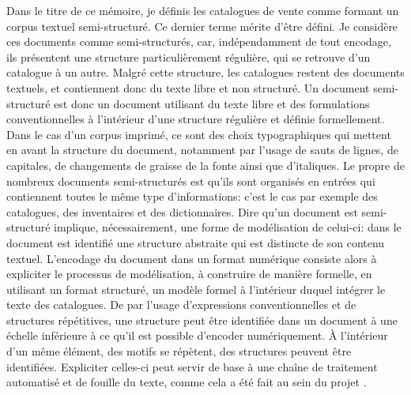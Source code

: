 Dans le titre de ce mémoire, je définis les catalogues de vente comme formant un corpus textuel semi-structuré. Ce dernier terme mérite d'être défini. Je considère ces documents comme semi-structurés, car, indépendamment de tout encodage, ils présentent une structure particulièrement régulière, qui se retrouve d'un catalogue à un autre. Malgré cette structure, les catalogues restent des documents textuels, et contiennent donc du texte libre et non structuré. Un document semi-structuré est donc un document utilisant du texte libre et des formulations conventionnelles à l'intérieur d'une structure régulière et définie formellement. Dans le cas d'un corpus imprimé, ce sont des choix typographiques qui mettent en avant la structure du document, notamment par l'usage de sauts de lignes, de capitales, de changements de graisse de la fonte ainsi que d'italiques. Le propre de nombreux documents semi-structurés est qu'ils sont organisés en entrées qui contiennent toutes le même type d'informations: c'est le cas par exemple des catalogues, des inventaires et des dictionnaires. Dire qu'un document est semi-structuré implique, nécessairement, une forme de modélisation de celui-ci: dans le document est identifié une structure abstraite qui est distincte de son contenu textuel. L'encodage du document dans un format numérique consiste alors à expliciter le processus de modélisation, à construire de manière formelle, en utilisant un format structuré, un modèle formel à l'intérieur duquel intégrer le texte des catalogues. De par l'usage d'expressions conventionnelles et de structures répétitives, une structure peut être identifiée dans un document à une échelle inférieure à ce qu'il est possible d'encoder numériquement. À l'intérieur d'un même élément, des motifs se répètent, des structures peuvent être identifiées. Expliciter celles-ci peut servir de base à une chaîne de traitement automatisé et de fouille du texte, comme cela a été fait au sein du projet \mssktb{}.

